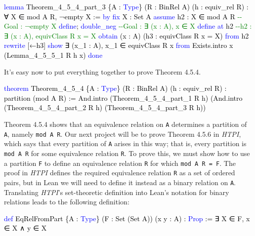 \documentclass[
  letterpaper,
  DIV=11,
  numbers=noendperiod]{scrreprt}
\newenvironment{Shaded}{\begin{snugshade}}{\end{snugshade}}
\newcommand{\CommentTok}[1]{\textcolor[rgb]{0.37,0.37,0.37}{#1}}
\newcommand{\KeywordTok}[1]{\textcolor[rgb]{0.00,0.23,0.31}{#1}}
\newcommand{\NormalTok}[1]{\textcolor[rgb]{0.00,0.23,0.31}{#1}}
\renewcommand{\NormalTok}[1]{\textcolor[HTML]{000000}{#1}}
\renewcommand{\KeywordTok}[1]{\textcolor[HTML]{0000FF}{#1}}
\renewcommand{\CommentTok}[1]{\textcolor[HTML]{008000}{#1}}
\theoremstyle{remark}
\begin{document}
\begin{Shaded}
\begin{Highlighting}[]
\KeywordTok{lemma}\NormalTok{ Theorem\_4\_5\_4\_part\_3 \{A : }\KeywordTok{Type}\NormalTok{\} (R : BinRel A) (h : equiv\_rel R) :}
\NormalTok{    ∀ X ∈ mod A R, ¬empty X := }\KeywordTok{by}
  \KeywordTok{fix}\NormalTok{ X : Set A}
  \KeywordTok{assume}\NormalTok{ h2 : X ∈ mod A R  }\CommentTok{{-}{-}Goal : ¬empty X}
  \KeywordTok{define}\NormalTok{; }\KeywordTok{double\_neg}       \CommentTok{{-}{-}Goal : ∃ (x : A), x ∈ X}
  \KeywordTok{define} \KeywordTok{at}\NormalTok{ h2             }\CommentTok{{-}{-}h2 : ∃ (x : A), equivClass R x = X}
  \KeywordTok{obtain}\NormalTok{ (x : A) (h3 : equivClass R x = X) }\KeywordTok{from}\NormalTok{ h2}
  \KeywordTok{rewrite}\NormalTok{ [←h3]}
  \KeywordTok{show}\NormalTok{ ∃ (x\_1 : A), x\_1 ∈ equivClass R x }\KeywordTok{from}
\NormalTok{    Exists.intro x (Lemma\_4\_5\_5\_1 R h x)}
  \KeywordTok{done}
\end{Highlighting}
\end{Shaded}

It's easy now to put everything together to prove Theorem 4.5.4.

\begin{Shaded}
\begin{Highlighting}[]
\KeywordTok{theorem}\NormalTok{ Theorem\_4\_5\_4 \{A : }\KeywordTok{Type}\NormalTok{\} (R : BinRel A) (h : equiv\_rel R) :}
\NormalTok{    partition (mod A R) := And.intro (Theorem\_4\_5\_4\_part\_1 R h)}
\NormalTok{      (And.intro (Theorem\_4\_5\_4\_part\_2 R h) (Theorem\_4\_5\_4\_part\_3 R h))}
\end{Highlighting}
\end{Shaded}

Theorem 4.5.4 shows that an equivalence relation on \texttt{A}
determines a partition of \texttt{A}, namely \texttt{mod\ A\ R}. Our
next project will be to prove Theorem 4.5.6 in \emph{HTPI}, which says
that every partition of \texttt{A} arises in this way; that is, every
partition is \texttt{mod\ A\ R} for some equivalence relation
\texttt{R}. To prove this, we must show how to use a partition
\texttt{F} to define an equivalence relation \texttt{R} for which
\texttt{mod\ A\ R\ =\ F}. The proof in \emph{HTPI} defines the required
equivalence relation \texttt{R} as a set of ordered pairs, but in Lean
we will need to define it instead as a binary relation on \texttt{A}.
Translating \emph{HTPI}'s set-theoretic definition into Lean's notation
for binary relations leads to the following definition:

\begin{Shaded}
\begin{Highlighting}[]
\KeywordTok{def}\NormalTok{ EqRelFromPart \{A : }\KeywordTok{Type}\NormalTok{\} (F : Set (Set A)) (x y : A) : }\KeywordTok{Prop}\NormalTok{ :=}
\NormalTok{  ∃ X ∈ F, x ∈ X ∧ y ∈ X}
\end{Highlighting}
\end{Shaded}
\end{document}
